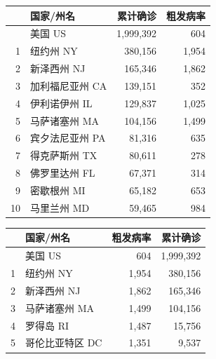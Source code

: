 \documentclass[
]{article}
\begin{document}
\begin{table}[H]
      \centering
    \begin{minipage}{.4\linewidth}
    \caption{美国累计确诊前十位州}
    \vspace{-0.5\baselineskip}
      \centering
    \captionsetup{justification=centering} \begin{table}[H]
\centering
\begin{tabular}{rlrr}
\toprule
  & 国家/州名 & 累计确诊 & 粗发病率\\
\midrule
\rowcolor{gray!6}   & 美国 US & 1,999,392 & 604\\
1 & 纽约州 NY & 380,156 & 1,954\\
\rowcolor{gray!6}  2 & 新泽西州 NJ & 165,346 & 1,862\\
3 & 加利福尼亚州 CA & 139,151 & 352\\
\rowcolor{gray!6}  4 & 伊利诺伊州 IL & 129,837 & 1,025\\
5 & 马萨诸塞州 MA & 104,156 & 1,499\\
\rowcolor{gray!6}  6 & 宾夕法尼亚州 PA & 81,316 & 635\\
7 & 得克萨斯州 TX & 80,611 & 278\\
\rowcolor{gray!6}  8 & 佛罗里达州 FL & 67,371 & 314\\
9 & 密歇根州 MI & 65,182 & 653\\
\rowcolor{gray!6}  10 & 马里兰州 MD & 59,465 & 984\\
\bottomrule
\end{tabular}
\end{table} \end{minipage}%
    \begin{minipage}{.6\linewidth}
     \caption{美国粗发病率前十位州}
     \vspace{-0.5\baselineskip}
      \centering
    \captionsetup{justification=centering} \begin{table}[H]
\centering
\begin{tabular}{rlrr}
\toprule
  & 国家/州名 & 粗发病率 & 累计确诊\\
\midrule
\rowcolor{gray!6}   & 美国 US & 604 & 1,999,392\\
1 & 纽约州 NY & 1,954 & 380,156\\
\rowcolor{gray!6}  2 & 新泽西州 NJ & 1,862 & 165,346\\
3 & 马萨诸塞州 MA & 1,499 & 104,156\\
\rowcolor{gray!6}  4 & 罗得岛 RI & 1,487 & 15,756\\
5 & 哥伦比亚特区 DC & 1,351 & 9,537\\

\end{tabular}
\end{table}
\end{minipage}
\end{table}
\end{document}
